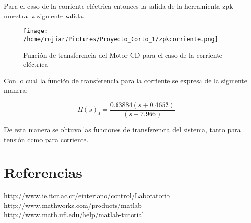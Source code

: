 \documentclass[a4paper,10pt,twocolumn]{article}
\begin{document}
\newpage
Para el caso de la corriente eléctrica entonces la salida de la herramienta zpk muestra la siguiente salida.

\begin{figure}[h!]
\centering
\texttt{[image: /home/rojiar/Pictures/Proyecto\_Corto\_1/zpkcorriente.png]}
\caption{Función de transferencia del Motor CD para el caso de la corriente eléctrica}
\label{Funcion de transferencia del Motor CD para el caso de la corriente electrica}
\end{figure}

Con lo cual la función de transferencia para la corriente se expresa de la siguiente manera:

\begin{center}
$$
 H(s)_I = \frac{0.63884 (s+0.4652)}{(s+7.966)}
$$  
\end{center}

De esta manera se obtuvo las funciones de transferencia del sistema, tanto para tensión como para corriente.

\section{Referencias}

http://www.ie.itcr.ac.cr/einteriano/control/Laboratorio
http://www.mathworks.com/products/matlab\\
http://www.math.ufl.edu/help/matlab-tutorial
\end{document}
